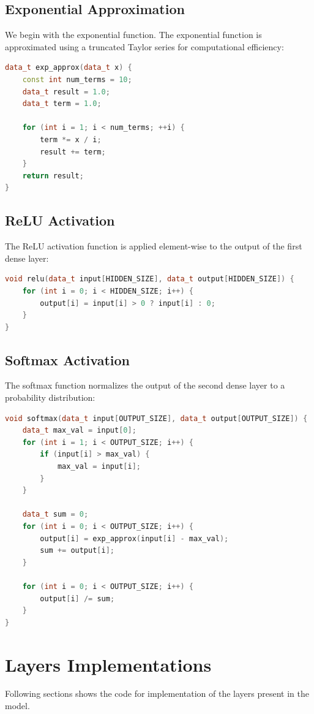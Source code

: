\documentclass{report}
\begin{document}
\subsection{Exponential Approximation}
We begin with the exponential function. The exponential function is approximated using a truncated Taylor series for computational efficiency:

\begin{lstlisting}[language=C++]
data_t exp_approx(data_t x) {
    const int num_terms = 10;
    data_t result = 1.0;
    data_t term = 1.0;

    for (int i = 1; i < num_terms; ++i) {
        term *= x / i;
        result += term;
    }
    return result;
}
\end{lstlisting}

\subsection{ReLU Activation}
The ReLU activation function is applied element-wise to the output of the first dense layer:

\begin{lstlisting}[language=C++]
void relu(data_t input[HIDDEN_SIZE], data_t output[HIDDEN_SIZE]) {
    for (int i = 0; i < HIDDEN_SIZE; i++) {
        output[i] = input[i] > 0 ? input[i] : 0;
    }
}
\end{lstlisting}

\subsection{Softmax Activation}
The softmax function normalizes the output of the second dense layer to a probability distribution:

\begin{lstlisting}[language=C++]
void softmax(data_t input[OUTPUT_SIZE], data_t output[OUTPUT_SIZE]) {
    data_t max_val = input[0];
    for (int i = 1; i < OUTPUT_SIZE; i++) {
        if (input[i] > max_val) {
            max_val = input[i];
        }
    }

    data_t sum = 0;
    for (int i = 0; i < OUTPUT_SIZE; i++) {
        output[i] = exp_approx(input[i] - max_val);
        sum += output[i];
    }

    for (int i = 0; i < OUTPUT_SIZE; i++) {
        output[i] /= sum;
    }
}
\end{lstlisting}

\section{Layers Implementations}
Following sections shows the code for implementation of the layers present in the model.
\end{document}
